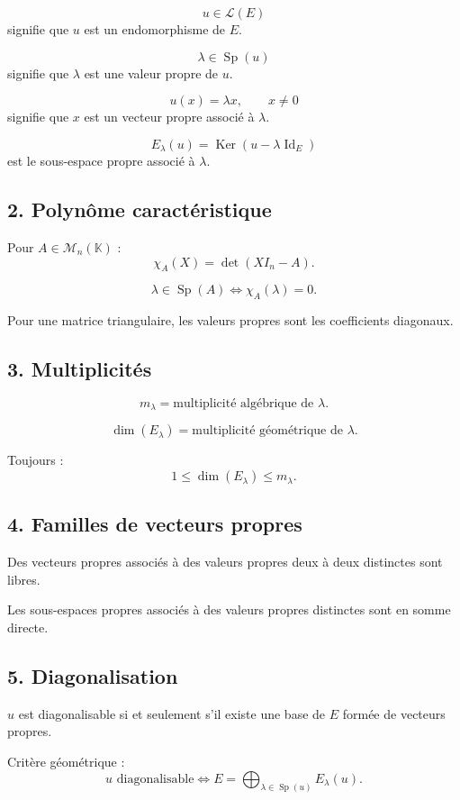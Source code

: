 \documentclass[11pt,a4paper]{article}
\newcommand{\K}{\mathbb K}
\newcommand{\M}{\mathcal M}
\newcommand{\Lcal}{\mathcal L}
\newcommand{\Ker}{\operatorname{Ker}}
\newcommand{\Id}{\operatorname{Id}}
\newcommand{\Sp}{\operatorname{Sp}}
\begin{document}
\[
u\in\Lcal(E)
\]
signifie que \(u\) est un endomorphisme de \(E\).

\[
\lambda\in\Sp(u)
\]
signifie que \(\lambda\) est une valeur propre de \(u\).

\[
u(x)=\lambda x,\qquad x\neq0
\]
signifie que \(x\) est un vecteur propre associé à \(\lambda\).

\[
E_\lambda(u)=\Ker(u-\lambda\Id_E)
\]
est le sous-espace propre associé à \(\lambda\).

\subsection*{2. Polynôme caractéristique}

Pour \(A\in\M_n(\K)\) :
\[
\chi_A(X)=\det(XI_n-A).
\]

\[
\lambda\in\Sp(A)
\Longleftrightarrow
\chi_A(\lambda)=0.
\]

Pour une matrice triangulaire, les valeurs propres sont les coefficients diagonaux.

\subsection*{3. Multiplicités}

\[
m_\lambda=\text{multiplicité algébrique de }\lambda.
\]

\[
\dim(E_\lambda)=\text{multiplicité géométrique de }\lambda.
\]

Toujours :
\[
1\leq \dim(E_\lambda)\leq m_\lambda.
\]

\subsection*{4. Familles de vecteurs propres}

Des vecteurs propres associés à des valeurs propres deux à deux distinctes sont libres.

Les sous-espaces propres associés à des valeurs propres distinctes sont en somme directe.

\subsection*{5. Diagonalisation}

\(u\) est diagonalisable si et seulement s'il existe une base de \(E\) formée de vecteurs propres.

Critère géométrique :
\[
u\text{ diagonalisable}
\Longleftrightarrow
E=\bigoplus_{\lambda\in\Sp(u)}E_\lambda(u).
\]
\end{document}
